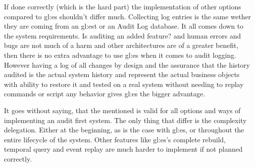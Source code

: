 If done correctly (which is the hard part) the implementation of other options compared to \gls{gl:es} shouldn't differ much. Collecting log entries is the same wether they are coming from an \gls{gl:est} or an Audit Log database. It all comes down to the system requirements. Is auditing an added feature? and human errors and bugs are not much of a harm and other architectures are of a greater benefit, then there is no extra advantage to use \gls{gl:es} when it comes to audit logging. However having a log of all changes by design and the assurance that the history audited is the actual system history and represent the actual business objects with ability to restore it and tested on a real system without needing to replay commands or script any behavior gives \gls{gl:es} the bigger advantage. 






It goes without saying, that the mentioned is valid for all options and ways of implementing an audit first system. The only thing that differ is the complexity delegation. Either at the beginning, as is the case with \gls{gl:es}, or throughout the entire lifecycle of the system. Other features like \gls{gl:es}'s complete rebuild, temporal query and event replay are much harder to implement if not planned correctly.







